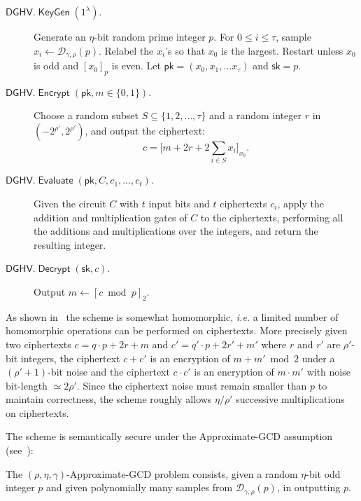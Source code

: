 \documentclass[11pt]{llncs}
\newcommand{\ie}{\textsl{i.e.}\xspace}
\renewcommand\leq\leqslant
\DeclareMathOperator{\KeyGen}{\ensuremath{\mathsf{KeyGen}}}
\DeclareMathOperator{\Encrypt}{\ensuremath{\mathsf{Encrypt}}}
\DeclareMathOperator{\Decrypt}{\ensuremath{\mathsf{Decrypt}}}
\DeclareMathOperator{\Evaluate}{\ensuremath{\mathsf{Evaluate}}}
\newcommand*{\pk}{\ensuremath{\mathsf{pk}}}
\newcommand*{\sk}{\ensuremath{\mathsf{sk}}}
\newcommand*{\DGHV}{\ensuremath{\mathsf{DGHV}}}
\begin{document}
\begin{description}
\item[$\DGHV.\KeyGen(1^\lambda)$.] Generate an $\eta$-bit random prime integer $p$. For $0 \leq i \leq \tau$, sample $
x_i \leftarrow \mathcal{D}_{\gamma,\rho}(p) $. Relabel the $x_i$'s  so
that $x_0$ is the largest. Restart unless $x_0$ is odd and $[x_0]_p$
is even. Let $\pk=(x_0,x_1,\ldots x_\tau)$ and $\sk=p$.
\\\vspace{-0.25cm}
\item[$\DGHV.\Encrypt(\pk, m \in \{0,1\})$.] Choose a random subset $S \subseteq
\{1,2,\ldots,\tau\}$ and a random integer $r$ in
$(-2^{\rho'}, 2^{\rho'})$, and output the ciphertext:
\begin{equation}
\label{eq:DGHV}
 c = \bigg[ m+2r+2 \sum\limits_{i \in S} x_i \bigg]_{x_0}.
\end{equation}
\vspace{-0.25cm}
\item[$\DGHV.\Evaluate(\pk, C, c_1, \ldots, c_t)$.] Given the circuit
$C$ with $t$ input bits and $t$ ciphertexts $c_i$, apply the addition
and multiplication gates of $C$ to the ciphertexts, performing all the
additions and multiplications over the integers, and return the
resulting integer.
\\\vspace{-0.25cm}
\item[$\DGHV.\Decrypt(\sk, c)$.] Output $m \leftarrow [c \bmod p]_2$.
\end{description}

As shown in~\cite{vDGHV2010} the scheme is somewhat homomorphic, \ie a
limited number of homomorphic operations can be performed on
ciphertexts. More precisely given two ciphertexts $c=q \cdot p+2r+m$
and $c'=q' \cdot p+2r'+m'$ where $r$ and $r'$ are $\rho'$-bit
integers, the ciphertext $c+c'$ is an encryption of
$m + m' \bmod 2$ under a $(\rho'+1)$-bit noise and the ciphertext $c \cdot
c'$ is an encryption of $m \cdot m'$ with noise bit-length $\simeq
2 \rho'$. Since the ciphertext noise must remain smaller than $p$ to maintain correctness, 
the scheme roughly allows $\eta/\rho'$ successive multiplications on ciphertexts.

The scheme is semantically secure under the Approximate-GCD assumption
(see~\cite{vDGHV2010}):

\begin{definition}
\label{def:approxGCD}
 The 
  $(\rho,\eta,\gamma)$-Approximate-GCD problem consists, given a random $ \eta $-bit odd integer $ p $ and
  given  polynomially many samples from $ \mathcal{D}_{\gamma,\rho}(p) $, in outputting $p$.
\end{definition}
\end{document}

